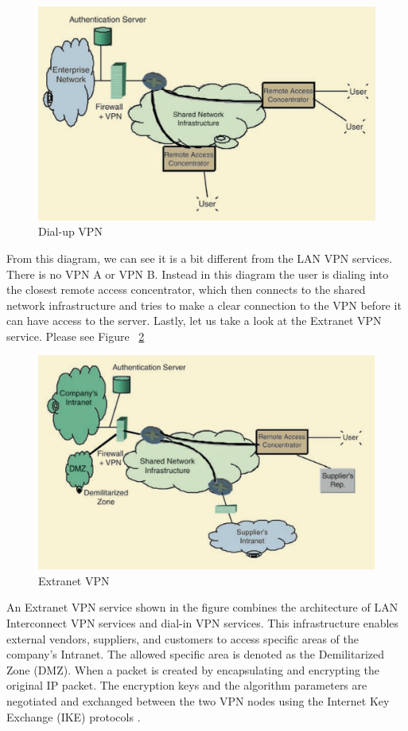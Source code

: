 \bigskip
\begin{figure}[hbt!]
\centering
\includegraphics[width=5in]{../images/Dial-up-VPN.png}%
\caption{Dial-up VPN}
\label{fig:Dial-up VPN}
\end{figure}
\bigskip

From this diagram, we can see it is a bit different from the LAN VPN services. There is no VPN A or VPN B. Instead in this diagram the user is dialing into the closest remote access concentrator, which then connects to the shared network infrastructure and tries to make a clear connection to the VPN before it can have access to the server. Lastly, let us take a look at the Extranet VPN service. Please see Figure ~\ref{fig:Extranet VPN}

\bigskip
\begin{figure}[hbt!]
\centering
\includegraphics[width=5in]{../images/Extranet-VPN.png}%
\caption{Extranet VPN}
\label{fig:Extranet VPN}
\end{figure}
\bigskip

An Extranet VPN service shown in the figure combines the architecture of LAN Interconnect VPN services and dial-in VPN services. This infrastructure enables external vendors, suppliers, and customers to access specific areas of the company’s Intranet. The allowed specific area is denoted as the Demilitarized Zone (DMZ). When a packet is created by encapsulating and encrypting the original IP packet. The encryption keys and the algorithm parameters are negotiated and exchanged between the two VPN nodes using the Internet Key Exchange (IKE) protocols \cite{venkateswaran2001virtual}.


